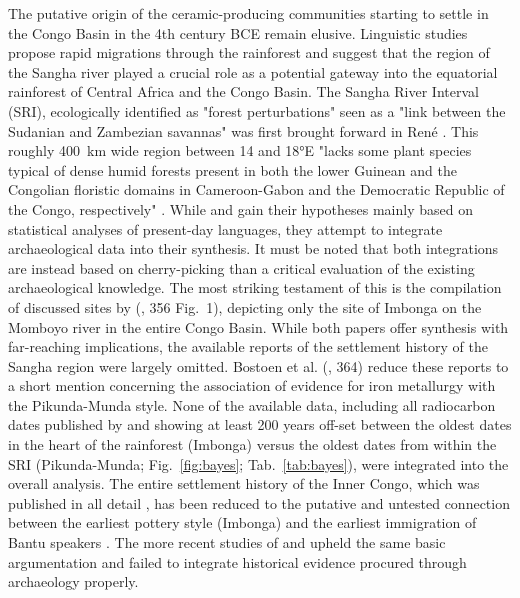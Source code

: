 \documentclass[smallextended,natbib]{svjour3}       %
\begin{document}
The putative origin of the ceramic-producing communities starting to settle in the Congo Basin in the 4th century BCE remain elusive. Linguistic studies \citep{Grollemund.2015,Bostoen.2015,Koile.2022,Grollemund.2023} propose rapid migrations through the rainforest and suggest that the region of the Sangha river played a crucial role as a potential gateway into the equatorial rainforest of Central Africa and the Congo Basin. The Sangha River Interval (SRI), ecologically identified as "forest perturbations" seen as a "link between the Sudanian and Zambezian savannas" \citep[356]{Bostoen.2015} was first brought forward in René \cite{Letouzey.1968}. This roughly 400~km wide region between 14 and 18°E "lacks some plant species typical of dense humid forests present in both the lower Guinean and the Congolian floristic domains in Cameroon-Gabon and the Democratic Republic of the Congo, respectively" \citep[356]{Bostoen.2015}. While \cite{Grollemund.2015} and \cite{Bostoen.2015} gain their hypotheses mainly based on statistical analyses of present-day languages, they attempt to integrate archaeological data into their synthesis. It must be noted that both integrations are instead based on cherry-picking than a critical evaluation of the existing archaeological knowledge. The most striking testament of this is the compilation of discussed sites by \citeauthor{Bostoen.2015} (\citeyear{Bostoen.2015}, 356 Fig.~1), depicting only the site of Imbonga on the Momboyo river in the entire Congo Basin. While both papers offer synthesis with far-reaching implications, the available reports of the settlement history of the Sangha region \citep{Eggert.1992,Eggert.1993} were largely omitted. Bostoen et al. (\citeyear{Bostoen.2015}, 364) reduce these reports to a short mention concerning the association of evidence for iron metallurgy with the Pikunda-Munda style. None of the available data, including all radiocarbon dates published by \cite{Eggert.1992,Eggert.1993} and showing at least 200 years off-set between the oldest dates in the heart of the rainforest (Imbonga) versus the oldest dates from within the SRI (Pikunda-Munda; Fig.~\ref{fig:bayes}; Tab.~\ref{tab:bayes}), were integrated into the overall analysis. The entire settlement history of the Inner Congo, which was published in all detail \citep{Eggert.1984,Eggert.1987c,Wotzka.1995}, has been reduced to the putative and untested connection between the earliest pottery style (Imbonga) and the earliest immigration of Bantu speakers \citep[366]{Bostoen.2015}. The more recent studies of \cite{Koile.2022} and \cite{Grollemund.2023} upheld the same basic argumentation and failed to integrate historical evidence procured through archaeology properly.
\end{document}
